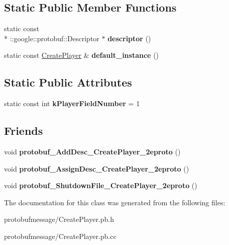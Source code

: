 \subsection*{Static Public Member Functions}
\begin{DoxyCompactItemize}
\item 
\hypertarget{class_create_player_aa432a2da91bb59e44581d02030991ae1}{static const \\*
\-::google\-::protobuf\-::\-Descriptor $\ast$ {\bfseries descriptor} ()}\label{class_create_player_aa432a2da91bb59e44581d02030991ae1}

\item 
\hypertarget{class_create_player_aeea9db2427ab00cdd0dbb69f8aa26fca}{static const \hyperlink{class_create_player}{Create\-Player} \& {\bfseries default\-\_\-instance} ()}\label{class_create_player_aeea9db2427ab00cdd0dbb69f8aa26fca}

\end{DoxyCompactItemize}
\subsection*{Static Public Attributes}
\begin{DoxyCompactItemize}
\item 
\hypertarget{class_create_player_a301c293ca078a99b8fe8aeaa5e269aa2}{static const int {\bfseries k\-Player\-Field\-Number} = 1}\label{class_create_player_a301c293ca078a99b8fe8aeaa5e269aa2}

\end{DoxyCompactItemize}
\subsection*{Friends}
\begin{DoxyCompactItemize}
\item 
\hypertarget{class_create_player_a508cc52b267f30a83163d9b681c4cdba}{void {\bfseries protobuf\-\_\-\-Add\-Desc\-\_\-\-Create\-Player\-\_\-2eproto} ()}\label{class_create_player_a508cc52b267f30a83163d9b681c4cdba}

\item 
\hypertarget{class_create_player_a41a443b4974448f74d433d838b28d2db}{void {\bfseries protobuf\-\_\-\-Assign\-Desc\-\_\-\-Create\-Player\-\_\-2eproto} ()}\label{class_create_player_a41a443b4974448f74d433d838b28d2db}

\item 
\hypertarget{class_create_player_acb5335721b54abf232629cbda4a21551}{void {\bfseries protobuf\-\_\-\-Shutdown\-File\-\_\-\-Create\-Player\-\_\-2eproto} ()}\label{class_create_player_acb5335721b54abf232629cbda4a21551}

\end{DoxyCompactItemize}


The documentation for this class was generated from the following files\-:\begin{DoxyCompactItemize}
\item 
protobufmessage/Create\-Player.\-pb.\-h\item 
protobufmessage/Create\-Player.\-pb.\-cc\end{DoxyCompactItemize}
